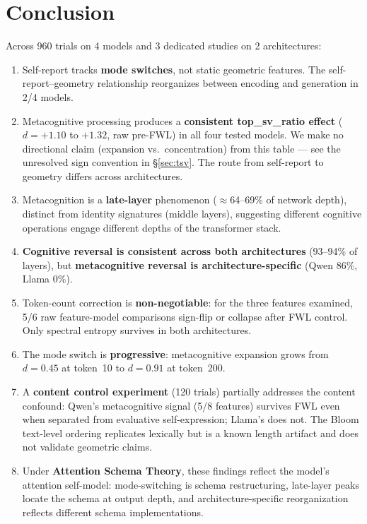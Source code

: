 \documentclass[11pt,a4paper]{article}
\begin{document}
\section{Conclusion}

Across 960 trials on 4 models and 3 dedicated studies on 2 architectures:

\begin{enumerate}
    \item Self-report tracks \textbf{mode switches}, not static geometric features. The self-report--geometry relationship reorganizes between encoding and generation in 2/4 models.

    \item Metacognitive processing produces a \textbf{consistent top\_sv\_ratio effect} ($d = +1.10$ to $+1.32$, raw pre-FWL) in all four tested models. We make no directional claim (expansion vs.\ concentration) from this table --- see the unresolved sign convention in \S\ref{sec:tsv}. The route from self-report to geometry differs across architectures.

    \item Metacognition is a \textbf{late-layer} phenomenon ($\approx$64--69\% of network depth), distinct from identity signatures (middle layers), suggesting different cognitive operations engage different depths of the transformer stack.

    \item \textbf{Cognitive reversal is consistent across both architectures} (93--94\% of layers), but \textbf{metacognitive reversal is architecture-specific} (Qwen 86\%, Llama 0\%).

    \item Token-count correction is \textbf{non-negotiable}: for the three features examined, 5/6 raw feature-model comparisons sign-flip or collapse after FWL control. Only spectral entropy survives in both architectures.

    \item The mode switch is \textbf{progressive}: metacognitive expansion grows from $d = 0.45$ at token~10 to $d = 0.91$ at token~200.

    \item A \textbf{content control experiment} (120 trials) partially addresses the content confound: Qwen's metacognitive signal (5/8 features) survives FWL even when separated from evaluative self-expression; Llama's does not. The Bloom text-level ordering replicates lexically but is a known length artifact and does not validate geometric claims.

    \item Under \textbf{Attention Schema Theory}, these findings reflect the model's attention self-model: mode-switching is schema restructuring, late-layer peaks locate the schema at output depth, and architecture-specific reorganization reflects different schema implementations.
\end{enumerate}
\end{document}
